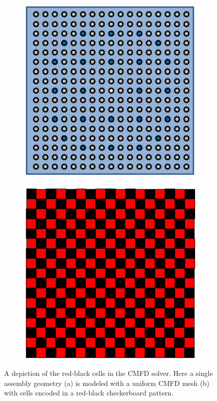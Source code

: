 \begin{figure}[h!]
	\centering
	\begin{subfigure}{0.45\textwidth}
		\centering
		\includegraphics[width=\linewidth]{figures/DD/sa-geometry.png}
		\caption{}
		\label{fig:red-black-a}
	\end{subfigure}
	\begin{subfigure}{0.45\textwidth}
		\centering
		\includegraphics[width=\linewidth]{figures/DD/sa-rb.png}
		\caption{}
		\label{fig:red-black-b}
	\end{subfigure}
	\caption[]{A depiction of the red-black cells in the \ac{CMFD} solver. Here a single assembly geometry (a) is modeled with a uniform \ac{CMFD} mesh (b) with cells encoded in a red-black checkerboard pattern.}
	\label{fig:red-black}
\end{figure}

